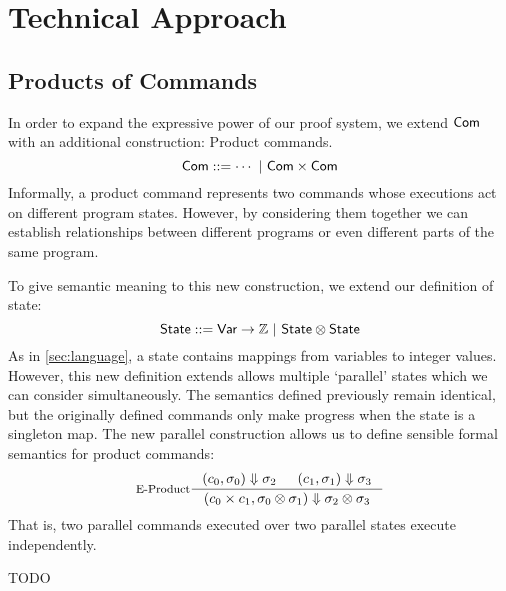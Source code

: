 \documentclass[p.tex]{subfiles}
\begin{document}
\section{Technical Approach}\label{sec:approach}
\subsection{Products of Commands}\label{sec:product-com}
In order to expand the expressive power of our proof system, we extend
$\textsf{Com}$ with an additional construction: Product commands.
\[ \textsf{Com} ::= \cdots~|~\textsf{Com}\times\textsf{Com} \]
Informally,
a product command represents two commands whose executions act on
different program states. However, by considering them together we can
establish relationships between different programs or even different
parts of the same program.

To give semantic meaning to this new construction, we extend our
definition of state:
\[\textsf{State} ::= \textsf{Var} \rightarrow \mathbb{Z}~|~\textsf{State}\otimes\textsf{State}\]
As in \cref{sec:language}, a state contains mappings from variables to integer
values. However, this new definition extends allows multiple
`parallel' states which we can consider simultaneously. The semantics
defined previously remain identical, but the originally defined
commands only make progress when the state is a singleton map. The new
parallel construction allows us to define sensible formal semantics for
product commands:
\begin{align*}
  \inference[E-Product]{%
    \ceval{c_0}{\sigma_0}{\sigma_2}&
    \ceval{c_1}{\sigma_1}{\sigma_3}
  }{%
    \ceval{\cprod{c_0}{c_1}}{\sprod{\sigma_0}{\sigma_1}}{\sprod{\sigma_2}{\sigma_3}}
  }
\end{align*}
That is, two parallel commands executed over two parallel states
execute independently.

TODO
\end{document}
